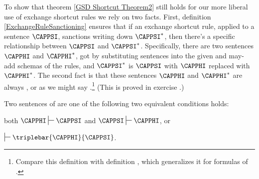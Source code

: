 To show that theorem \ref{GSD Shortcut Theorem2} still holds for our more liberal use of exchange shortcut rules we rely on two facts. 
First, definition \ref{ExchangeRuleSanctioning} ensures that if an exchange shortcut rule, applied to a sentence $\CAPPSI$, sanctions writing down $\CAPPSI^*$, then there's a specific relationship between $\CAPPSI$ and $\CAPPSI^*$. 
Specifically, there are two sentences $\CAPPHI$ and $\CAPPHI^*$, got by substituting sentences into the given and may-add schemas of the rules, and $\CAPPSI^*$ is $\CAPPSI$ with $\CAPPHI$ replaced with $\CAPPHI^*$. 
The second fact is that these sentences $\CAPPHI$ and $\CAPPHI^*$ are always , or as we might say .\footnote{Compare 
this definition with definition , which generalizes it for formulas of \GQL{}.} 
(This is proved in exercise .)
\begin{majorILnc}{}
Two sentences of \GSL{} are  \Iff one of the following two equivalent conditions holds:
\begin{cenumerate}
\item both $\CAPPHI\sststile{}{}\CAPPSI$ and $\CAPPSI\sststile{}{}\CAPPHI$, or
\item $\sststile{}{}\triplebar{\CAPPHI}{\CAPPSI}$.
\end{cenumerate}
\end{majorILnc}


